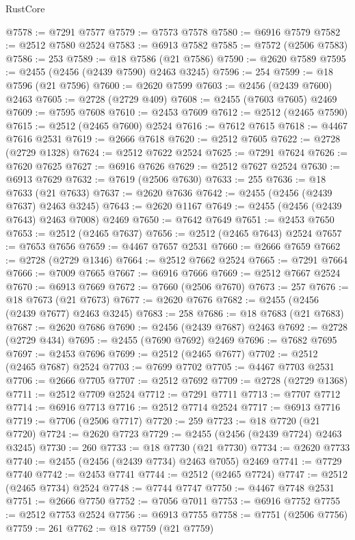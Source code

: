 \begin{lexlean}{RustCore}
\begin{coremodule}
@7578 := @7291 @7577
@7579 := @7573 @7578
@7580 := @6916 @7579
@7582 := @2512 @7580 @2524
@7583 := @6913 @7582
@7585 := @7572 (@2506 @7583)
@7586 := 253
@7589 := @18 @7586 (@21 @7586)
@7590 := @2620 @7589
@7595 := @2455 (@2456 (@2439 @7590) @2463 @3245)
@7596 := 254
@7599 := @18 @7596 (@21 @7596)
@7600 := @2620 @7599
@7603 := @2456 (@2439 @7600) @2463
@7605 := @2728 (@2729 @409)
@7608 := @2455 (@7603 @7605) @2469
@7609 := @7595 @7608
@7610 := @2453 @7609
@7612 := @2512 (@2465 @7590)
@7615 := @2512 (@2465 @7600) @2524
@7616 := @7612 @7615
@7618 := @4467 @7616 @2531
@7619 := @2666 @7618
@7620 := @2512 @7605
@7622 := @2728 (@2729 @1328)
@7624 := @2512 @7622 @2524
@7625 := @7291 @7624
@7626 := @7620 @7625
@7627 := @6916 @7626
@7629 := @2512 @7627 @2524
@7630 := @6913 @7629
@7632 := @7619 (@2506 @7630)
@7633 := 255
@7636 := @18 @7633 (@21 @7633)
@7637 := @2620 @7636
@7642 := @2455 (@2456 (@2439 @7637) @2463 @3245)
@7643 := @2620 @1167
@7649 := @2455 (@2456 (@2439 @7643) @2463 @7008) @2469
@7650 := @7642 @7649
@7651 := @2453 @7650
@7653 := @2512 (@2465 @7637)
@7656 := @2512 (@2465 @7643) @2524
@7657 := @7653 @7656
@7659 := @4467 @7657 @2531
@7660 := @2666 @7659
@7662 := @2728 (@2729 @1346)
@7664 := @2512 @7662 @2524
@7665 := @7291 @7664
@7666 := @7009 @7665
@7667 := @6916 @7666
@7669 := @2512 @7667 @2524
@7670 := @6913 @7669
@7672 := @7660 (@2506 @7670)
@7673 := 257
@7676 := @18 @7673 (@21 @7673)
@7677 := @2620 @7676
@7682 := @2455 (@2456 (@2439 @7677) @2463 @3245)
@7683 := 258
@7686 := @18 @7683 (@21 @7683)
@7687 := @2620 @7686
@7690 := @2456 (@2439 @7687) @2463
@7692 := @2728 (@2729 @434)
@7695 := @2455 (@7690 @7692) @2469
@7696 := @7682 @7695
@7697 := @2453 @7696
@7699 := @2512 (@2465 @7677)
@7702 := @2512 (@2465 @7687) @2524
@7703 := @7699 @7702
@7705 := @4467 @7703 @2531
@7706 := @2666 @7705
@7707 := @2512 @7692
@7709 := @2728 (@2729 @1368)
@7711 := @2512 @7709 @2524
@7712 := @7291 @7711
@7713 := @7707 @7712
@7714 := @6916 @7713
@7716 := @2512 @7714 @2524
@7717 := @6913 @7716
@7719 := @7706 (@2506 @7717)
@7720 := 259
@7723 := @18 @7720 (@21 @7720)
@7724 := @2620 @7723
@7729 := @2455 (@2456 (@2439 @7724) @2463 @3245)
@7730 := 260
@7733 := @18 @7730 (@21 @7730)
@7734 := @2620 @7733
@7740 := @2455 (@2456 (@2439 @7734) @2463 @7055) @2469
@7741 := @7729 @7740
@7742 := @2453 @7741
@7744 := @2512 (@2465 @7724)
@7747 := @2512 (@2465 @7734) @2524
@7748 := @7744 @7747
@7750 := @4467 @7748 @2531
@7751 := @2666 @7750
@7752 := @7056 @7011
@7753 := @6916 @7752
@7755 := @2512 @7753 @2524
@7756 := @6913 @7755
@7758 := @7751 (@2506 @7756)
@7759 := 261
@7762 := @18 @7759 (@21 @7759)

\end{coremodule}
\end{lexlean}

